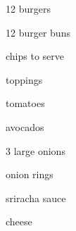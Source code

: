 \begin{ingredient}
    \begin{main}
        \item 12 burgers
        \item 12 burger buns
        \item chips to serve
    \end{main}
    \begin{subingredient}{toppings}
        \item tomatoes
        \item avocados
        \item 3 large onions
        \item onion rings
        \item sriracha sauce
        \item cheese
    \end{subingredient}
\end{ingredient}
\begin{recipe}
\end{recipe}